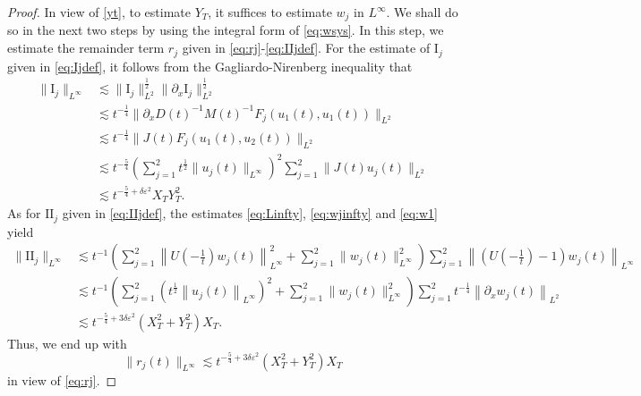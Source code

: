 \documentclass[11pt,a4paper,twosides]{amsart}
\theoremstyle{plain}
\theoremstyle{remark}
\numberwithin{equation}{section}
\theoremstyle{definition}
\newcommand{\1}{{\bf 1}_{\{|x| < |t|\}}}
\renewcommand{\epsilon}{\varepsilon}
\begin{document}
\begin{proof}
In view of \eqref{yt}, to estimate $Y_T$, 
it suffices to estimate $w_j$ in $L^\infty$.
We shall do so in the next two steps by using the integral form of \eqref{eq:wsys}. 
 In this step, we estimate the remainder term $r_j$ given in 
 \eqref{eq:rj}-\eqref{eq:IIjdef}.
  For the estimate of $\textrm{I}_j$ given in 
  \eqref{eq:Ijdef}, it follows from the Gagliardo-Nirenberg inequality that
  \begin{align*}
    \|\textrm{I}_j\|_{L^\infty} & \lesssim
    \|\textrm{I}_j\|_{L^2}^\frac12 \|\partial_x\textrm{I}_j\|_{L^2}^\frac12                                        \\
                                & \lesssim t^{-\frac14}\|\partial_xD(t)^{-1}M(t)^{-1}F_j(u_1(t), u_1(t))\|_{L^2}   \\
                                & \lesssim t^{-\frac14}\|J(t)F_j(u_1(t), u_2(t))\|_{L^2}                           \\
                                & \lesssim t^{-\frac54}\left(\sum_{j=1}^2t^{\frac12}\|u_j(t)\|_{L^\infty}\right)^2
    \sum_{j=1}^2\|J(t)u_j(t)\|_{L^2}                                                                               \\
                                & \lesssim t^{-\frac54+\delta\epsilon^2}X_TY_T^2.
  \end{align*}
As for $\textrm{II}_j$ given in \eqref{eq:IIjdef}, the estimates 
\eqref{eq:Linfty}, \eqref{eq:wjinfty} and \eqref{eq:w1} yield
  \begin{align*}
    \|\textrm{II}_j\|_{L^\infty} & \lesssim t^{-1}
    \left(\sum_{j=1}^2\left\|U(-\tfrac{1}{t})w_j(t)\right\|_{L^\infty}^2 + \sum_{j=1}^2\|w_j(t)\|_{L^\infty}^2\right)
    \sum_{j=1}^2\left\|(U(-\tfrac{1}{t})-1)w_j(t)\right\|_{L^\infty}                          \\
                                 & \lesssim t^{-1}
    \left(\sum_{j=1}^2(t^{\frac12}\left\|u_j(t)\right\|_{L^\infty})^2 
    + \sum_{j=1}^2\|w_j(t)\|_{L^\infty}^2\right)
    \sum_{j=1}^2t^{-\frac14}\left\|\partial_x w_j(t)\right\|_{L^2}                            \\
                                 & \lesssim t^{-\frac54+3\delta\epsilon^2}(X_T^2 + Y_T^2)X_T.
  \end{align*}
  Thus, we end up with
  \begin{equation}\label{eq:rjest}
  \|r_j(t)\|_{L^\infty} \lesssim
  t^{-\frac54+3\delta\epsilon^2}(X_T^2 + Y_T^2)X_T
  \end{equation}
  in view of \eqref{eq:rj}.
  

\end{proof}
\end{document}
